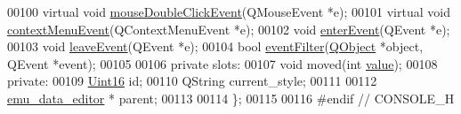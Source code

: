\begin{DoxyCode}
00100     \textcolor{keyword}{virtual} \textcolor{keywordtype}{void} \hyperlink{a00077_a408a766481a987b9f165de7bd54a1a38}{mouseDoubleClickEvent}(QMouseEvent *e);
00101     \textcolor{keyword}{virtual} \textcolor{keywordtype}{void} \hyperlink{a00077_ac5ddce14c487d6bc720035cf338e8021}{contextMenuEvent}(QContextMenuEvent *e);
00102     \textcolor{keywordtype}{void} \hyperlink{a00077_ad7ad2fd0571f0f8486732f783802eb0e}{enterEvent}(QEvent *e);
00103     \textcolor{keywordtype}{void} \hyperlink{a00077_a40078aca597449b51938078628c695ae}{leaveEvent}(QEvent *e);
00104     \textcolor{keywordtype}{bool} \hyperlink{a00077_aec3191237e5d11f90059f9758173b544}{eventFilter}(\hyperlink{a00059}{QObject} *\textcolor{keywordtype}{object}, QEvent *event);
00105 
00106 \textcolor{keyword}{private} slots:
00107     \textcolor{keywordtype}{void} moved(\textcolor{keywordtype}{int} \hyperlink{a00116_aee90379adb0307effb138f4871edbc5c}{value});
00108 \textcolor{keyword}{private}:
00109     \hyperlink{a00004_aae7407b021d43f7193a81a58cfb3e297}{Uint16} id;
00110     QString current\_style;
00111 
00112     \hyperlink{a00008}{emu\_data\_editor} * parent;
00113 
00114 \};
00115 
00116 \textcolor{preprocessor}{#endif // CONSOLE\_H}
\end{DoxyCode}
